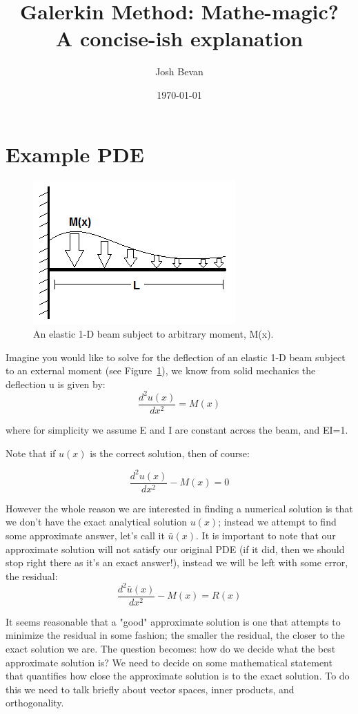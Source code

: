 \documentclass[letterpaper,12pt]{article}
\title{Galerkin Method: Mathe-magic?\\ A concise-ish explanation}
\author{Josh Bevan}
\date{\today}
\newcommand{\be}{\begin{equation}}
\newcommand{\ee}{\end{equation}}
\begin{document}
\maketitle
\section{Example PDE}

\begin{figure}
\centering
\includegraphics{Beam.PNG}
\caption{\label{fig:Beam}An elastic 1-D beam subject to arbitrary moment, M(x).}
\end{figure}

Imagine you would like to solve for the deflection of an elastic 1-D beam subject to an external moment (see Figure~\ref{fig:Beam}), we know from solid mechanics the deflection u is given by:
\be\frac{d^2u(x)}{dx^2} = M(x)\ee

where for simplicity we assume E and I are constant across the beam, and EI=1.

Note that if $u(x)$ is the correct solution, then of course:

\be\frac{d^2u(x)}{dx^2}- M(x)=0\ee


However the whole reason we are interested in finding a numerical solution is that we don't have the exact analytical solution $u(x)$; instead we attempt to find some approximate answer, let's call it $\bar{u}(x)$. It is important to note that our approximate solution will not satisfy our original PDE (if it did, then we should stop right there as it's an exact answer!), instead we will be left with some error, the residual:
\be \frac{d^2\bar{u}(x)}{dx^2}- M(x)=R(x)\ee

It seems reasonable that a "good" approximate solution is one that attempts to minimize the residual in some fashion; the smaller the residual, the closer to the exact solution we are. The question becomes: how do we decide what the best approximate solution is? We need to decide on some mathematical statement that quantifies how close the approximate solution is to the exact solution. To do this we need to talk briefly about vector spaces, inner products, and orthogonality.
\end{document}
